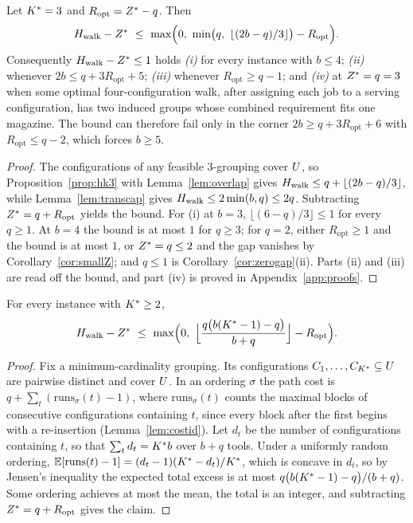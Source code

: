 \begin{proposition}[The walk gap at $\Kst=3$]\label{prop:k3}
Let $\Kst=3$ and $R_{\mathrm{opt}}=Z^{\ast}-q$. Then
\[
  \Hwalk-\Zst\ \le\ \max\Bigl(0,\ \min\bigl(q,\ \lfloor(2b-q)/3\rfloor\bigr)
  -R_{\mathrm{opt}}\Bigr).
\]
Consequently $H_{\mathrm{walk}}-Z^{\ast}\le1$ holds
\emph{(i)} for every instance with $b\le4$;
\emph{(ii)} whenever $2b\le q+3R_{\mathrm{opt}}+5$;
\emph{(iii)} whenever $R_{\mathrm{opt}}\ge q-1$; and
\emph{(iv)} at $Z^{\ast}=q=3$ when some optimal four-configuration walk, after assigning
each job to a serving configuration, has two induced groups whose combined
requirement fits one magazine.
The bound can therefore fail only in the corner
$2b\ge q+3R_{\mathrm{opt}}+6$ with $R_{\mathrm{opt}}\le q-2$, which forces $b\ge5$.
\end{proposition}

\begin{proof}
The configurations of any feasible $3$-grouping cover $U$, so
Proposition~\ref{prop:hk3} with Lemma~\ref{lem:overlap} gives
$H_{\mathrm{walk}}\le q+\lfloor(2b-q)/3\rfloor$, while Lemma~\ref{lem:transcap} gives
$H_{\mathrm{walk}}\le2\min(b,q)\le 2q$. Subtracting $Z^{\ast}=q+R_{\mathrm{opt}}$ yields the bound.
For (i) at $b=3$, $\lfloor(6-q)/3\rfloor\le1$ for every $q\ge1$. At $b=4$ the bound
is at most $1$ for $q\ge3$; for $q=2$, either $R_{\mathrm{opt}}\ge1$ and the bound is
at most $1$, or $Z^{\ast}=q\le2$ and the gap vanishes by Corollary~\ref{cor:smallZ}; and
$q\le1$ is Corollary~\ref{cor:zerogap}(ii). Parts (ii) and (iii) are read off the
bound, and part (iv) is proved in Appendix~\ref{app:proofs}.
\end{proof}

\begin{proposition}\label{prop:genk}
For every instance with $K^{\ast}\ge2$,
\[
  H_{\mathrm{walk}}-Z^{\ast}\ \le\ \max\Bigl(0,\
  \Bigl\lfloor\frac{q\bigl(b(K^{\ast}-1)-q\bigr)}{b+q}\Bigr\rfloor-R_{\mathrm{opt}}\Bigr).
\]
\end{proposition}

\begin{proof}
Fix a minimum-cardinality grouping. Its configurations $C_1,\dots,C_{K^{\ast}}\subseteq U$
are pairwise distinct and cover $U$. In an ordering $\sigma$ the path cost is
$q+\sum_t(\mathrm{runs}_\sigma(t)-1)$, where $\mathrm{runs}_\sigma(t)$ counts the
maximal blocks of consecutive configurations containing $t$, since every block after
the first begins with a re-insertion (Lemma~\ref{lem:costid}). Let $d_t$ be the number
of configurations containing $t$, so that $\sum_t d_t=K^{\ast} b$ over $b+q$ tools. Under
a uniformly random ordering,
$\mathbb{E}[\mathrm{runs}(t)-1]=(d_t-1)(K^{\ast}-d_t)/K^{\ast}$, which is concave in $d_t$, so
by Jensen's inequality the expected total excess is at most
$q\bigl(b(K^{\ast}-1)-q\bigr)/(b+q)$. Some ordering achieves at most the mean, the total is
an integer, and subtracting $Z^{\ast}=q+R_{\mathrm{opt}}$ gives the claim.
\end{proof}

